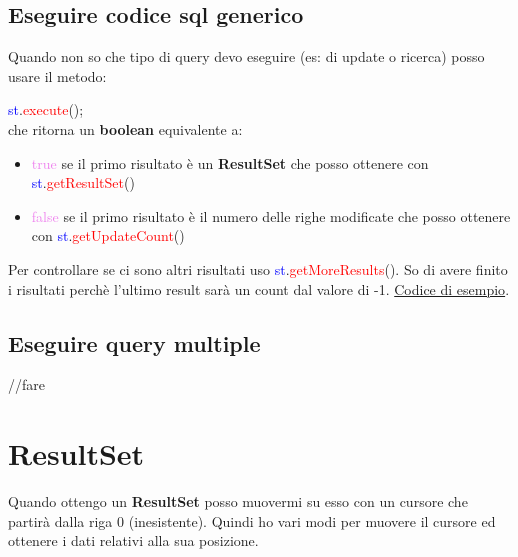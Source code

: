 \documentclass[11pt, letterpaper, titlepage]{article}
\begin{document}
\subsection{Eseguire codice sql generico}
Quando non so che tipo di query devo eseguire (es: di update o ricerca) posso usare il metodo:\par
\textcolor{blue}{st}.\textcolor{red}{execute}();\\
che ritorna un \textbf{boolean} equivalente a:
\begin{itemize}
    \item \textcolor{violet}{true} se il primo risultato è un \textbf{ResultSet} che posso ottenere
          con \textcolor{blue}{st}.\textcolor{red}{getResultSet}()
    \item \textcolor{violet}{false} se il primo risultato è il numero delle righe modificate che posso ottenere
          con \textcolor{blue}{st}.\textcolor{red}{getUpdateCount}()
\end{itemize}
Per controllare se ci sono altri risultati uso \textcolor{blue}{st}.\textcolor{red}{getMoreResults}().
So di avere finito i risultati perchè l'ultimo result sarà un count dal valore di -1.
\href{https://stackoverflow.com/questions/52700237/executequery-vs-getresultset-in-java#:~:text=boolean%20isResultSet%20%3D%20statement.execute(sql)%3B}{Codice di esempio}.

\subsection{Eseguire query multiple}
//fare

\section{ResultSet}
Quando ottengo un \textbf{ResultSet} posso muovermi su esso con un cursore che partirà dalla riga 0 (inesistente).
Quindi ho vari modi per muovere il cursore ed ottenere i dati relativi alla sua posizione.
\end{document}
